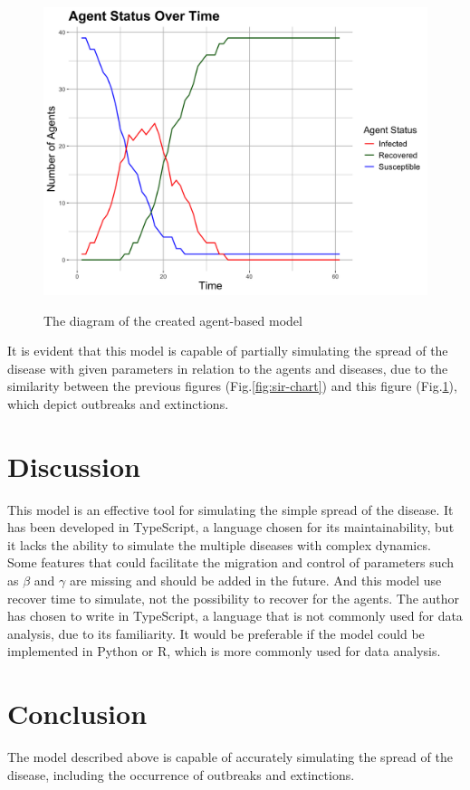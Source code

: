 \documentclass[12pt]{article}
\begin{document}
\begin{figure}[ht]
	\centering
	\includegraphics[width=0.9\linewidth]{./assets/report-20246030-132911/diagram.png}
    \label{fig:agent-based-model-chart} 
	\caption{\scriptsize \sffamily The diagram of the created agent-based model}
\end{figure}

It is evident that this model is capable of partially simulating the spread of the disease with given parameters in relation to the agents and diseases, due to the similarity between the previous figures (Fig.\ref{fig:sir-chart}) and this figure (Fig.\ref{fig:agent-based-model-chart}), which depict outbreaks and extinctions.

\section{Discussion}
This model is an effective tool for simulating the simple spread of the disease. It has been developed in TypeScript, a language chosen for its maintainability, but it lacks the ability to simulate the multiple diseases with complex dynamics. Some features that could facilitate the migration and control of parameters such as $\beta$ and $\gamma$ are missing and should be added in the future. And this model use recover time to simulate, not the possibility to recover for the agents. The author has chosen to write in TypeScript, a language that is not commonly used for data analysis, due to its familiarity. It would be preferable if the model could be implemented in Python or R, which is more commonly used for data analysis.

\section{Conclusion}
The model described above is capable of accurately simulating the spread of the disease, including the occurrence of outbreaks and extinctions.
\end{document}
